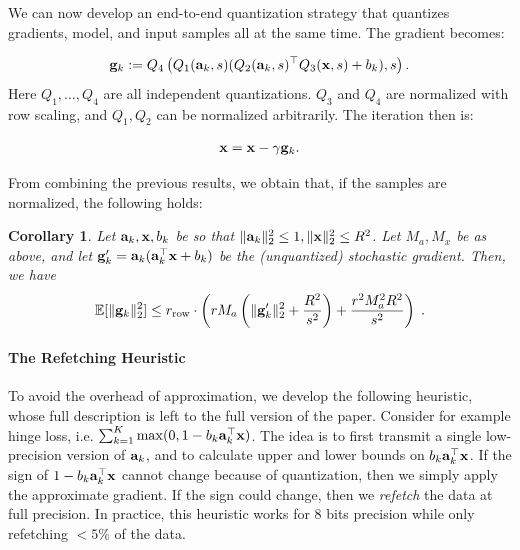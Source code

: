 \documentclass{article}
\def\a{{\bf a}}
\def\g{{\bf g}}
\def\x{{\bf x}}
\def\E{\mathbb{E}}
\def\rrow{r_\mathrm{row}}
\newtheorem{corollary}{Corollary}
\begin{document}
We can now develop an end-to-end quantization strategy that
quantizes gradients, model, and input samples all 
at the same time. The gradient becomes:

\begin{eqnarray}
	\g_k := Q_4 \left( Q_1(\a_k, s ) ( Q_2(\a_k, s)^\top Q_3(\x, s) + b_k) , s \right).
\end{eqnarray}
\noindent Here $Q_1, \ldots, Q_4$ are all independent quantizations.  $Q_3$ and  $Q_4$ are normalized with row scaling, and $Q_1, Q_2$ can be normalized arbitrarily.
The iteration then is: 

\begin{eqnarray}
	\x = \x - \gamma \g_k.
\end{eqnarray}

\noindent From combining the previous results, we obtain that, if the samples are normalized, the following holds:

\begin{corollary}
    \label{cor:full-quantization}
    Let $\a_k, \x, b_k$ be so that $\| \a_k \|_2^2 \leq 1, \| \x \|_2^2 \leq R^2$.
    Let $M_a, M_x$ be as above, and let $\g'_k = \a_k (\a_k^\top \x + b_k)$ be the (unquantized) stochastic gradient.
    Then, we have
    \[
    \E [\| \g_k \|_2^2] \leq \rrow \cdot \left( r M_a \left( \| \g'_k \|_2^2 + \frac{R^2}{s^2} \right)  + \frac{r^2 M_a^2 R^2}{s^2} \right) \; .
    \]
\end{corollary}






\paragraph*{The Refetching Heuristic}
To avoid the overhead of approximation, we develop the following heuristic, whose full description is left to the full version of the paper. 
Consider for example hinge loss, i.e.  $\sum_{k=1}^K \max(0, 1 - b_k \a_k^\top \x)$. 
The idea is to 
first transmit a single low-precision version of $\a_k$, and to  
calculate upper and lower bounds on $b_k \a_k^\top \x$.
If the sign of $1-b_k \a_k^\top \x$ cannot change because of quantization, then we simply apply the approximate gradient. 
If the sign could change, then we {\em refetch} the data at full precision.
In practice, this heuristic works for 
8 bits precision while only refetching $<5\%$
of the data.
\end{document}
